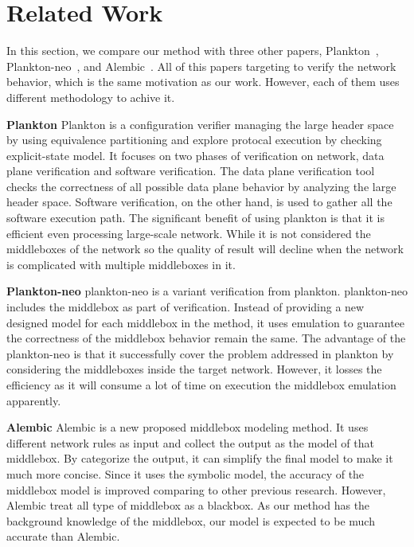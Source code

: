 \section{Related Work}

In this section, we compare our method with three other papers, \ci
Plankton~\cite{2017-Prabhu}, \cii Plankton-neo~\cite{2018-PrabhuEtAl}, and \ciii
Alembic~\cite{2019-MoonEtAl}. All of this papers targeting to verify the network
behavior, which is the same motivation as our work. However, each of them uses
different methodology to achive it.

\textbf{Plankton} Plankton is a configuration verifier managing the large header
space by using equivalence partitioning and explore protocal execution by
checking explicit-state model. It focuses on two phases of verification on
network, \ci data plane verification and \cii software verification. The data
plane verification tool checks the correctness of all possible data plane
behavior by analyzing the large header space. Software verification, on the
other hand, is used to gather all the software execution path. The significant
benefit of using plankton is that it is efficient even processing large-scale
network. While it is not considered the middleboxes of the network so the
quality of result will decline when the network is complicated with multiple
middleboxes in it.

\textbf{Plankton-neo} plankton-neo is a variant verification from plankton.
plankton-neo includes the middlebox as part of verification. Instead of
providing a new designed model for each middlebox in the method, it uses
emulation to guarantee the correctness of the middlebox behavior remain the
same. The advantage of the plankton-neo is that it successfully cover the
problem addressed in plankton by considering the middleboxes inside the target
network. However, it losses the efficiency as it will consume a lot of time on
execution the middlebox emulation apparently.

\textbf{Alembic} Alembic is a new proposed middlebox modeling method. It uses
different network rules as input and collect the output as the model of that
middlebox. By categorize the output, it can simplify the final model to make it
much more concise. Since it uses the symbolic model, the accuracy of the
middlebox model is improved comparing to other previous research. However,
Alembic treat all type of middlebox as a blackbox. As our method has the
background knowledge of the middlebox, our model is expected to be much accurate
than Alembic.


